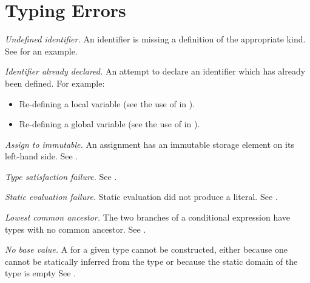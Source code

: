 \section{Typing Errors\label{sec:TypingErrors}}
\begin{description}

\hypertarget{def-undefinedidentifier}{}
\item[$\UndefinedIdentifier$]
  \textit{Undefined identifier.}
  An identifier is missing a definition of the appropriate kind.
  See  for an example.

\hypertarget{def-identifieralreadydeclared}{}
\item[$\IdentifierAlreadyDeclared$]
  \textit{Identifier already declared.}
  An attempt to declare an identifier which has already been defined.
  For example:
  \begin{itemize}
    \item Re-defining a local variable (see the use of  in ).
    \item Re-defining a global variable (see the use of  in ).
  \end{itemize}

\hypertarget{def-aim}{}
\item[$\AssignmentToImmutable$]
  \textit{Assign to immutable.}
  An assignment has an immutable storage element on its left-hand side.
  See .

\hypertarget{def-typesatisfactionfailure}{}
\item[$\TypeSatisfactionFailure$]
  \textit{Type satisfaction failure.}
  See .

\hypertarget{def-staticevaluationfailure}{}
\item[$\StaticEvaluationFailure$]
  \textit{Static evaluation failure.}
  Static evaluation did not produce a literal.
  See .

\hypertarget{def-nolca}{}
\item[$\NoLCA$]
  \textit{Lowest common ancestor.}
  The two branches of a conditional expression have types with no common ancestor.
  See .

\hypertarget{def-nobasevalue}{}
\item[$\NoBaseValue$]
  \textit{No base value.}
  A \basevalueterm{} for a given type cannot be constructed, either because one cannot be statically inferred from the type or because the static domain of the type is empty
  See .


\end{description}
